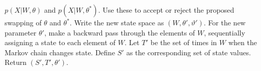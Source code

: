 \begin{algorithm}[H]
\begin{algorithmic}[1]
    $p(X|W,\theta)$ and $p(X|W,\theta^*)$. Use these to accept or reject the
    proposed swapping of $\theta$ and $\theta^*$. Write the new state space
    as $(W,\theta',\vartheta')$.
    \State For the new parameter $\theta'$, make a backward pass through 
    the elements of
    $W$, sequentially assigning a state to each element of $W$.
    \State Let $T'$ be the set of times in $W$ when the Markov chain changes state. Define $S'$ as the corresponding set of state values. Return $(S', T', \theta')$.
\end{algorithmic}
\end{algorithm}

